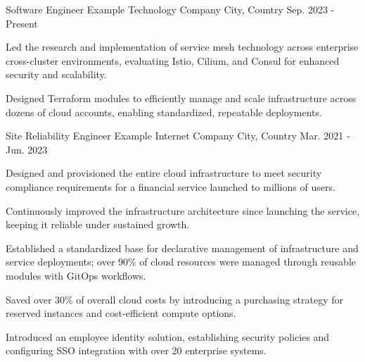 

\begin{cventries}

  \cventry
    {Software Engineer} %
    {Example Technology Company} %
    {City, Country} %
    {Sep. 2023 - Present} %
    {
      \begin{cvitems} %
        \item {Led the research and implementation of service mesh technology across enterprise cross-cluster environments, evaluating Istio, Cilium, and Consul for enhanced security and scalability.}
        \item {Designed Terraform modules to efficiently manage and scale infrastructure across dozens of cloud accounts, enabling standardized, repeatable deployments.}
      \end{cvitems}
    }

  \cventry
    {Site Reliability Engineer} %
    {Example Internet Company} %
    {City, Country} %
    {Mar. 2021 - Jun. 2023} %
    {
      \begin{cvitems} %
        \item {Designed and provisioned the entire cloud infrastructure to meet security compliance requirements for a financial service launched to millions of users.}
        \item {Continuously improved the infrastructure architecture since launching the service, keeping it reliable under sustained growth.}
        \item {Established a standardized base for declarative management of infrastructure and service deployments; over 90\% of cloud resources were managed through reusable modules with GitOps workflows.}
        \item {Saved over 30\% of overall cloud costs by introducing a purchasing strategy for reserved instances and cost-efficient compute options.}
        \item {Introduced an employee identity solution, establishing security policies and configuring SSO integration with over 20 enterprise systems.}
      \end{cvitems}
    }


\end{cventries}
